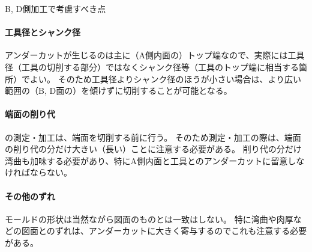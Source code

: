 \begin{Column}{B, D側\dimple 加工で考慮すべき点}
\paragraph*{工具径とシャンク径}
アンダーカットが生じるのは主に（A側内面の）トップ端なので、実際には工具径（工具の切削する部分）ではなくシャンク径等（工具のトップ端に相当する箇所）でよい。
そのため工具径よりシャンク径のほうが小さい場合は、より広い範囲の（B, D面の）\dimple を傾けずに切削することが可能となる。
\tcbline*
\paragraph*{端面の削り代}
\dimple の測定・加工は、端面を切削する前に行う。
そのため測定・加工の際は、端面の削り代の分だけ大きい（長い）ことに注意する必要がある。
削り代の分だけ湾曲も加味する必要があり、特にA側内面と工具とのアンダーカットに留意しなければならない。
\tcbline*
\paragraph*{その他のずれ}
モールドの形状は当然ながら図面のものとは一致はしない。
特に湾曲や肉厚などの図面とのずれは、アンダーカットに大きく寄与するのでこれも注意する必要がある。
\end{Column}






